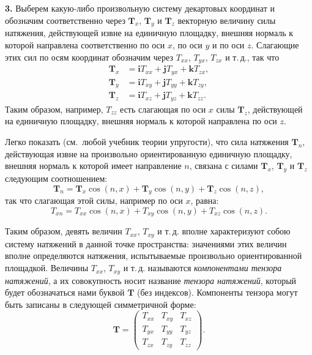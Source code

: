 \documentclass[a4paper,10pt]{article}
\begin{document}
\textbf{3.} Выберем какую-либо произвольную систему декартовых координат
и обозначим соответственно через $\mathbf{T}_x$, $\mathbf{T}_y$ и
$\mathbf{T}_z$ векторную величину силы натяжения, действующей извне на
единичную площадку, внешняя нормаль к которой направлена соответственно
по оси $x$, по оси $y$ и по оси $z$. Слагающие этих сил по осям
координат обозначим через $T_{xx}$, $T_{yx}$, $T_{zx}$ и т.\,д., так
что
\begin{align*}
    \mathbf{T}_x &= \mathbf{i}T_{xx} + \mathbf{j}T_{yx} + \mathbf{k}T_{zx}, \\
    \mathbf{T}_y &= \mathbf{i}T_{xy} + \mathbf{j}T_{yy} + \mathbf{k}T_{zy}, \\
    \mathbf{T}_z &= \mathbf{i}T_{xz} + \mathbf{j}T_{yz} + \mathbf{k}T_{zz}.
\end{align*}
Таким образом, например, $T_{zz}$ есть слагающая по оси $x$ силы
$\mathbf{T}_z$, действующей на единичную площадку, внешняя нормаль
к которой направлена по оси $z$.


Легко показать (см.\ любой учебник теории упругости), что сила
натяжения $\mathbf{T}_n$, действующая извне на произвольно
ориентированную единичную площадку, внешняя нормаль к которой имеет
направление $n$, связана с силами $\mathbf{T}_x$, $\mathbf{T}_y$
и $\mathbf{T}_z$ следующим соотношением:
\begin{equation}
    \mathbf{T}_n = \mathbf{T}_x\cos(n,x) + \mathbf{T}_y\cos(n,y)
                 + \mathbf{T}_z\cos(n,z),
    \tag{33.4}
\end{equation}
так что слагающая этой силы, например по оси $x$, равна:
\begin{equation}
    T_{xn} = T_{xx}\cos(n,x) + T_{xy}\cos(n,y) + T_{xz}\cos(n,z).
    \tag{33.5}
\end{equation}

Таким образом, девять величин $T_{xx}$, $T_{xy}$ и т.\,д. вполне
характеризуют собою систему натяжений в данной точке пространства:
значениями этих величин вполне определяются натяжения, испытываемые
произвольно ориентированной площадкой. Величины $T_{xx}$, $T_{xy}$
и т.\,д. называются \textit{компонентами тензора натяжений}, а их
совокупность носит название \textit{тензора натяжений}, который будет
обозначаться нами буквой $\mathbf{T}$ (без индексов). Компоненты
тензора могут быть записаны в следующей симметричной форме:
\begin{equation}
    \mathbf{T} =
    \begin{pmatrix}
        T_{xx} & T_{xy} & T_{xz} \\
        T_{yx} & T_{yy} & T_{yz} \\
        T_{zx} & T_{zy} & T_{zz}
    \end{pmatrix}.
    \tag{33.6}
\end{equation}
\end{document}
